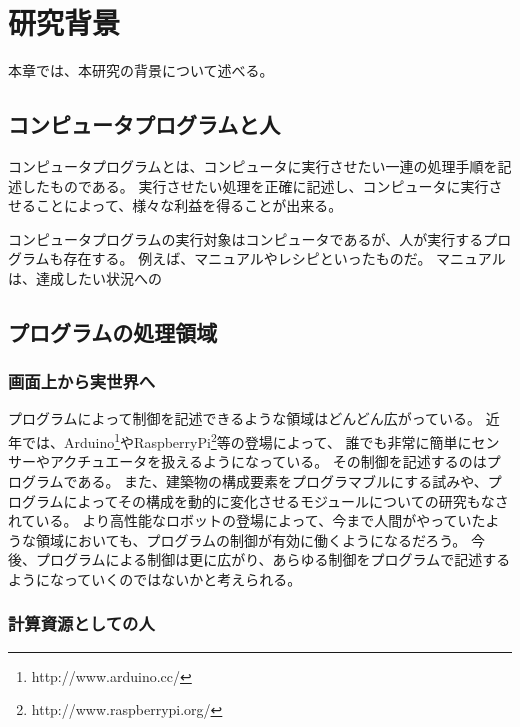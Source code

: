 \chapter{研究背景}\label{chap:background}

本章では、本研究の背景について述べる。

\section{コンピュータプログラムと人}\label{ux30b3ux30f3ux30d4ux30e5ux30fcux30bfux30d7ux30edux30b0ux30e9ux30e0ux3068ux4eba}

コンピュータプログラムとは、コンピュータに実行させたい一連の処理手順を記述したものである。
実行させたい処理を正確に記述し、コンピュータに実行させることによって、様々な利益を得ることが出来る。

コンピュータプログラムの実行対象はコンピュータであるが、人が実行するプログラムも存在する。
例えば、マニュアルやレシピといったものだ。
マニュアルは、達成したい状況への

\section{プログラムの処理領域}\label{ux30d7ux30edux30b0ux30e9ux30e0ux306eux51e6ux7406ux9818ux57df}

\subsection{画面上から実世界へ}\label{ux753bux9762ux4e0aux304bux3089ux5b9fux4e16ux754cux3078}

プログラムによって制御を記述できるような領域はどんどん広がっている。
近年では、Arduino\footnote{http://www.arduino.cc/}やRaspberryPi\footnote{http://www.raspberrypi.org/}等の登場によって、
誰でも非常に簡単にセンサーやアクチュエータを扱えるようになっている。
その制御を記述するのはプログラムである。
また、建築物の構成要素をプログラマブルにする試み\cite{squama}や、プログラムによってその構成を動的に変化させるモジュールについての研究もなされている。
より高性能なロボットの登場によって、今まで人間がやっていたような領域においても、プログラムの制御が有効に働くようになるだろう。
今後、プログラムによる制御は更に広がり、あらゆる制御をプログラムで記述するようになっていくのではないかと考えられる。

\subsection{計算資源としての人}\label{ux8a08ux7b97ux8cc7ux6e90ux3068ux3057ux3066ux306eux4eba}

